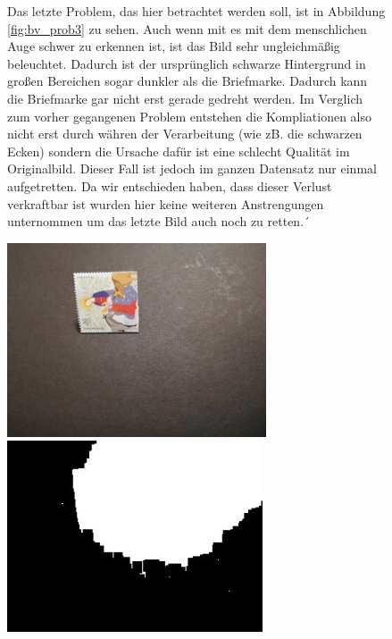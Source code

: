 \documentclass[12pt,toc=bib,toc=listof]{scrreprt}
\begin{document}
\begin{figure}[h]
\begin{minipage}[t]{.75\linewidth}

Das letzte Problem, das hier betrachtet werden soll, ist in Abbildung \ref{fig:bv_prob3} zu sehen. Auch wenn mit es mit dem menschlichen Auge schwer zu erkennen ist, ist das Bild sehr ungleichmäßig beleuchtet. Dadurch ist der ursprünglich schwarze Hintergrund in großen Bereichen sogar dunkler als die Briefmarke. Dadurch kann die Briefmarke gar nicht erst gerade gedreht werden. Im Verglich zum vorher gegangenen Problem entstehen die Kompliationen also nicht erst durch währen der Verarbeitung (wie zB. die schwarzen Ecken) sondern die Ursache dafür ist eine schlecht Qualität im Originalbild. Dieser Fall ist jedoch im ganzen Datensatz nur einmal aufgetretten. Da wir entschieden haben, dass dieser Verlust verkraftbar ist wurden hier keine weiteren Anstrengungen unternommen um das letzte Bild auch noch zu retten.´
\end{minipage}
\hfill
\begin{minipage}[t]{.2\linewidth}
  \strut\vspace*{-\baselineskip}\newline\includegraphics[width=\linewidth]{./bilder/prob3_pic}
  \includegraphics[width=\linewidth]{./bilder/prob3_bad_bin}

\end{minipage}
\end{figure}
\end{document}
